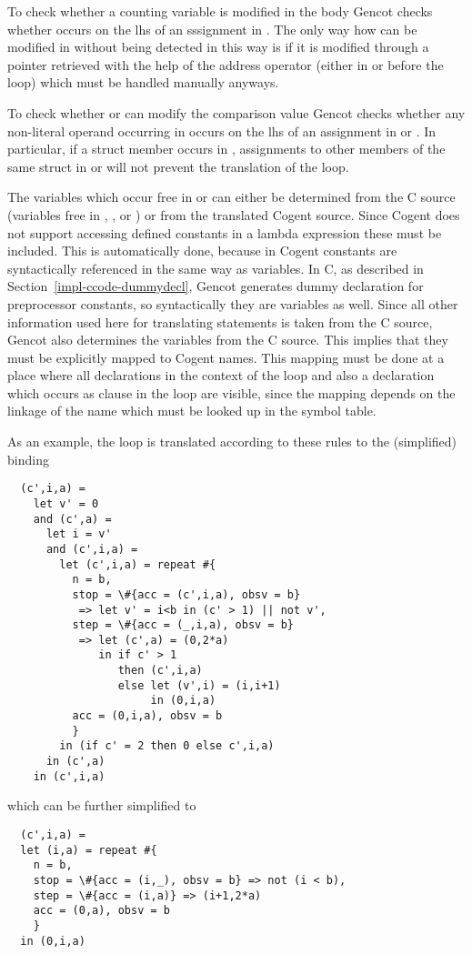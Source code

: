 To check whether a counting variable  is modified in the body  Gencot checks whether  occurs on the lhs
of an sssignment in . The only way how  can be modified in  without being detected in this way is if it 
is modified through a pointer retrieved with
the help of the address operator \code{\&} (either in  or before the loop) which must be handled manually anyways.

To check whether  or  can modify the comparison value  Gencot checks whether any non-literal operand 
occurring in  occurs on the lhs of an assignment in  or . In particular, if a struct member occurs 
in , assignments to other members of the same struct in  or  will not prevent the translation of the loop.

The variables  which occur free in  or  can either be determined from the C source (variables
free in , , or ) or from the translated Cogent source. Since Cogent does not support accessing defined
constants in a lambda expression these must be included. This is automatically done, because in Cogent constants are syntactically
referenced in the same way as variables. In C, as described in Section~\ref{impl-ccode-dummydecl}, Gencot generates dummy declaration
for preprocessor constants, so syntactically they are variables as well. Since all other information used here for translating 
 statements is taken from the C source, Gencot also determines the variables  from the C source. This implies
that they must be explicitly mapped to Cogent names. This mapping must be done at a place where all declarations in the context
of the loop and also a declaration which occurs as clause  in the loop are visible, since the mapping depends on the 
linkage of the name which must be looked up in the symbol table.

As an example, the loop  is translated according to these rules to the (simplified) binding
\begin{verbatim}
  (c',i,a) = 
    let v' = 0
    and (c',a) = 
      let i = v'
      and (c',i,a) =
        let (c',i,a) = repeat #{
          n = b,
          stop = \#{acc = (c',i,a), obsv = b} 
           => let v' = i<b in (c' > 1) || not v',
          step = \#{acc = (_,i,a), obsv = b} 
           => let (c',a) = (0,2*a)
              in if c' > 1 
                 then (c',i,a)
                 else let (v',i) = (i,i+1)
                      in (0,i,a)
          acc = (0,i,a), obsv = b
          }
        in (if c' = 2 then 0 else c',i,a)
      in (c',a)
    in (c',i,a)
\end{verbatim}
which can be further simplified to
\begin{verbatim}
  (c',i,a) = 
  let (i,a) = repeat #{
    n = b,
    stop = \#{acc = (i,_), obsv = b} => not (i < b),
    step = \#{acc = (i,a)} => (i+1,2*a)
    acc = (0,a), obsv = b
    }
  in (0,i,a)
\end{verbatim}

